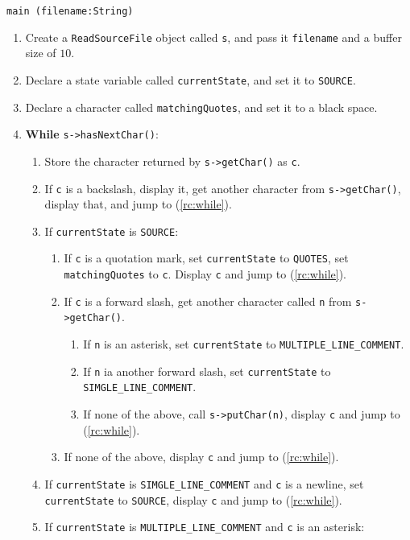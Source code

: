 \algorithm
\texttt{main (filename:String)}
\begin{enumerate}
	\item Create a \texttt{ReadSourceFile} object called \texttt{s}, and pass it \texttt{filename} and a buffer size of $10$.
	\item Declare a state variable called \texttt{currentState}, and set it to \texttt{SOURCE}.
	\item Declare a character called \texttt{matchingQuotes}, and set it to a black space.
	\item \textbf{While} \texttt{s->hasNextChar()}: \label{rc:while}
	\begin{enumerate}
		\item Store the character returned by \texttt{s->getChar()} as \texttt{c}.
		\item If \texttt{c} is a backslash, display it, get another character from \texttt{s->getChar()},
			display that, and jump to (\ref{rc:while}).
		\item If \texttt{currentState} is \texttt{SOURCE}:
		\begin{enumerate}
			\item If \texttt{c} is a quotation mark, set \texttt{currentState} to \texttt{QUOTES}, set \texttt{matchingQuotes} to
				\texttt{c}. Display \texttt{c} and jump to (\ref{rc:while}).
			\item If \texttt{c} is a forward slash, get another character called \texttt{n} from \texttt{s->getChar()}.
			\begin{enumerate}
				\item If \texttt{n} is an asterisk, set \texttt{currentState} to \texttt{MULTIPLE\_LINE\_COMMENT}.
				\item If \texttt{n} ia another forward slash, set \texttt{currentState} to \texttt{SIMGLE\_LINE\_COMMENT}.
				\item If none of the above, call \texttt{s->putChar(n)}, display \texttt{c} and jump to (\ref{rc:while}).
			\end{enumerate}
			\item If none of the above, display \texttt{c} and jump to (\ref{rc:while}).
		\end{enumerate}
		\item If \texttt{currentState} is \texttt{SIMGLE\_LINE\_COMMENT} and \texttt{c} is a newline, set \texttt{currentState} to
			\texttt{SOURCE}, display \texttt{c} and jump to (\ref{rc:while}).
		\item If \texttt{currentState} is \texttt{MULTIPLE\_LINE\_COMMENT} and \texttt{c} is an asterisk:

\end{enumerate}
\end{enumerate}
